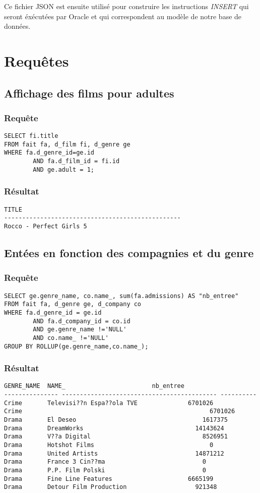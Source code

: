 Ce fichier JSON est ensuite utilisé pour construire les instructions \emph{INSERT} qui seront éxécutées par Oracle et qui correspondent au modèle de notre base de données.

\section{Requêtes}

\subsection{Affichage des films pour adultes}
\subsubsection{Requête}
\begin{lstlisting}
SELECT fi.title
FROM fait fa, d_film fi, d_genre ge
WHERE fa.d_genre_id=ge.id
		AND fa.d_film_id = fi.id
		AND ge.adult = 1;
\end{lstlisting}
\subsubsection{Résultat}
\begin{lstlisting}
TITLE
-------------------------------------------------
Rocco - Perfect Girls 5
\end{lstlisting}

\subsection{Entées en fonction des compagnies et du genre}
\subsubsection{Requête}
\begin{lstlisting}
SELECT ge.genre_name, co.name_, sum(fa.admissions) AS "nb_entree"
FROM fait fa, d_genre ge, d_company co
WHERE fa.d_genre_id = ge.id
		AND fa.d_company_id = co.id
		AND ge.genre_name !='NULL'
		AND co.name_ !='NULL'
GROUP BY ROLLUP(ge.genre_name,co.name_);
\end{lstlisting}
\subsubsection{Résultat}
\begin{lstlisting}
GENRE_NAME	NAME_					     nb_entree
--------------- ------------------------------------------- ----------
Crime		Televisi??n Espa??ola TVE		       6701026
Crime							                         6701026
Drama		El Deseo				                   1617375
Drama		DreamWorks				                 14143624
Drama		V??a Digital				               8526951
Drama		Hotshot Films					             0
Drama		United Artists				             14871212
Drama		France 3 Cin??ma				           0
Drama		P.P. Film Polski				           0
Drama		Fine Line Features			           6665199
Drama		Detour Film Production				     921348
\end{lstlisting}

